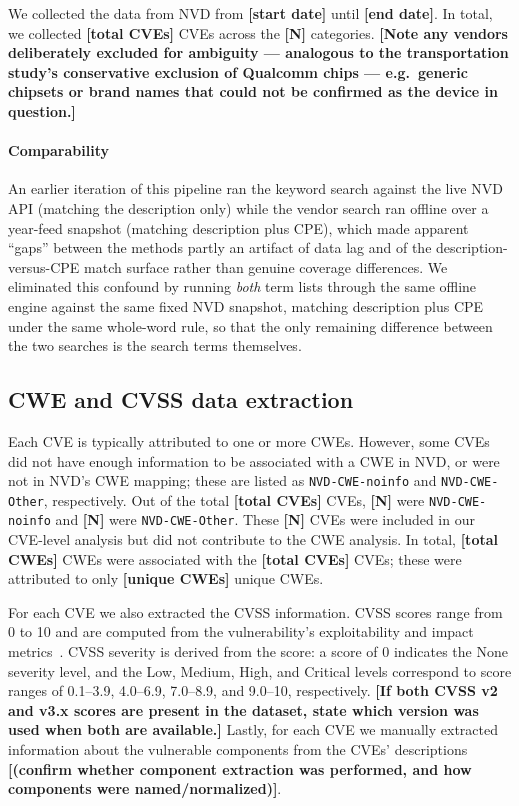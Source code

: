 \documentclass[conference]{IEEEtran}
\newcommand{\stub}[1][?]{{\color{red}\textbf{[#1]}}}
\begin{document}
We collected the data from NVD from \stub[start date] until \stub[end date]. In
total, we collected \stub[total CVEs] CVEs across the \stub[N] categories.
\stub[Note any vendors deliberately excluded for ambiguity --- analogous to the
transportation study's conservative exclusion of Qualcomm chips --- e.g.\ generic
chipsets or brand names that could not be confirmed as the device in question.]

\paragraph{Comparability} An earlier iteration of this pipeline ran the keyword
search against the live NVD API (matching the description only) while the vendor
search ran offline over a year-feed snapshot (matching description plus CPE), which
made apparent ``gaps'' between the methods partly an artifact of data lag and of the
description-versus-CPE match surface rather than genuine coverage differences. We
eliminated this confound by running \emph{both} term lists through the same offline
engine against the same fixed NVD snapshot, matching description plus CPE under the
same whole-word rule, so that the only remaining difference between the two searches
is the search terms themselves.

\subsection{CWE and CVSS data extraction}
\label{sec:method-extract}

Each CVE is typically attributed to one or more CWEs. However, some CVEs did not
have enough information to be associated with a CWE in NVD, or were not in NVD's
CWE mapping; these are listed as \texttt{NVD-CWE-noinfo} and
\texttt{NVD-CWE-Other}, respectively. Out of the total \stub[total CVEs] CVEs,
\stub[N] were \texttt{NVD-CWE-noinfo} and \stub[N] were \texttt{NVD-CWE-Other}.
These \stub[N] CVEs were included in our CVE-level analysis but did not contribute
to the CWE analysis. In total, \stub[total CWEs] CWEs were associated with the
\stub[total CVEs] CVEs; these were attributed to only \stub[unique CWEs] unique
CWEs.

For each CVE we also extracted the CVSS information. CVSS scores range from 0 to
10 and are computed from the vulnerability's exploitability and impact
metrics~\cite{ref-cvss}. CVSS severity is derived from the score: a score of 0
indicates the None severity level, and the Low, Medium, High, and Critical levels
correspond to score ranges of 0.1--3.9, 4.0--6.9, 7.0--8.9, and 9.0--10,
respectively. \stub[If both CVSS v2 and v3.x scores are present in the dataset,
state which version was used when both are available.] Lastly, for each CVE we
manually extracted information about the vulnerable components from the CVEs'
descriptions \stub[(confirm whether component extraction was performed, and how
components were named/normalized)].
\end{document}
